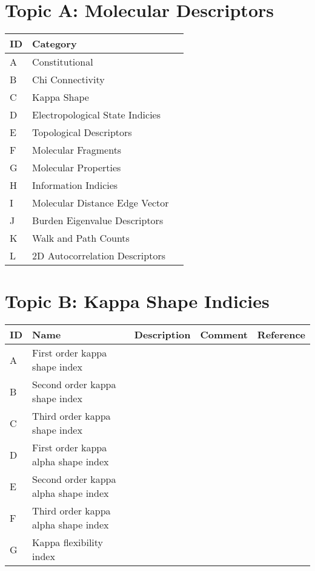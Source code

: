 
\section{Topic A: Molecular Descriptors}

\begin{table}[H]\centering
\footnotesize
\begin{tabular}{p{1cm}p{1cm}p{1cm}}
ID & Category & \\
	\hline
A & Constitutional & & \\
B & Chi Connectivity & & \\
C & Kappa Shape & & \\
D & Electropological State Indicies & & \\
E & Topological Descriptors & & \\
F & Molecular Fragments & & \\
G & Molecular Properties & & \\
H & Information Indicies & & \\
I & Molecular Distance Edge Vector &  & \\
J & Burden Eigenvalue Descriptors & & \\
K & Walk and Path Counts & & \\
L & 2D Autocorrelation Descriptors & & \\
\hline 
\hline
\end{tabular}
\end{table}

\section{Topic B: Kappa Shape Indicies}

\begin{table}[H]\centering
\begin{tabular}{p{1cm}p{2cm}p{3cm}p{3cm}p{1cm}}
ID & Name & Description & Comment & Reference \\
\hline
A & First order kappa shape index & & & \\
B & Second order kappa shape index & & &  \\
C & Third order kappa shape index & & &  \\
D & First order kappa alpha shape index & & &  \\
E & Second order kappa alpha shape index & & &  \\
F & Third order kappa alpha shape index & & &  \\
G & Kappa flexibility index & & &  \\ 
\hline
\end{tabular}
\end{table}

